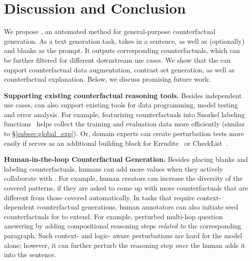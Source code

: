 \section{Discussion and Conclusion}
\label{sec:discuss}

We propose \sysname, an automated method for general-purpose counterfactual generation. 
As a text generation task, \sysname takes in a sentence, as well as (optionally) \tagstrs and blanks as the prompt.
It outputs corresponding counterfactuals, which can be further filtered for different downstream use cases. 
We show that the \sysname can support counterfactual data augmentation, contrast set generation, as well as counterfactual explanation.
Below, we discuss promising future work:

\textbf{Supporting existing counterfactual reasoning tools.}
Besides independent use cases, \sysname can also support existing tools for data programming, model testing and error analysis.
For example, featurizing counterfactuals into Snorkel labeling functions~\cite{ratner2017snorkel} helps collect the training and evaluation data more efficiently (similar to \S\ref{subsec:global_exp}).
Or, domain experts can create perturbation tests more easily if \sysname serves as an additional building block for Errudite~\cite{wu2019errudite} or CheckList~\cite{checklist:acl20}.


\textbf{Human-in-the-loop Counterfactual Generation.}
Besides placing blanks and labeling counterfactuals, humans can add more values when they actively collaborate with \sysname.
For example, human creators can increase the diversity of the covered patterns, if they are asked to come up with more counterfactuals that are different from those covered automatically.
In tasks that require context-dependent counterfactual generations, human annotators can also initiate seed counterfactuals for \sysname to extend.
For example, \citet{gardner2020contrast} perturbed multi-hop question answering by adding compositional reasoning steps \emph{related to} the corresponding paragraph.
Such context- and logic- aware perturbations are hard for the model alone; however, it can further perturb the reasoning step \emph{once} the human adds it into the sentence.

